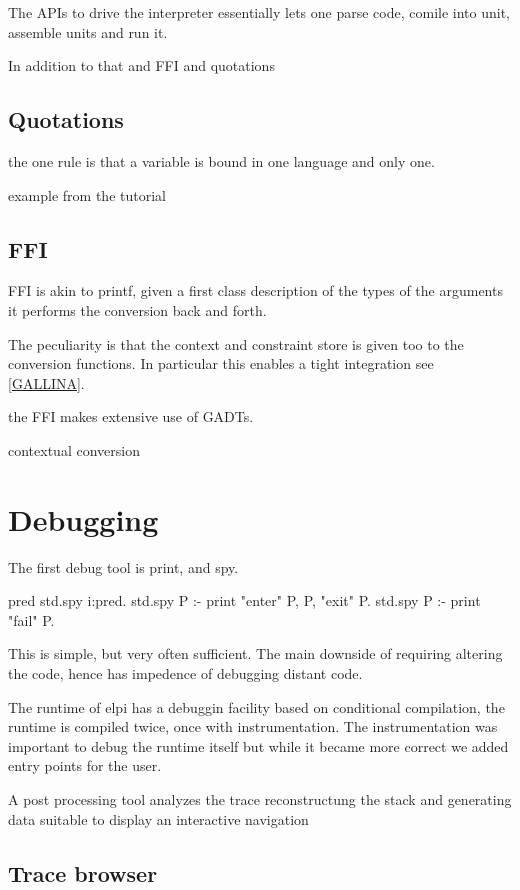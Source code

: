 \documentclass[a4paper, 11pt]{book}
\begin{document}
The APIs to drive the interpreter essentially lets one parse code, comile into
unit, assemble units and run it.

In addition to that and FFI and quotations

\subsection{Quotations}

the one rule is that a variable is bound in one language and only
one.

example from the tutorial

\subsection{FFI}\label{FFI}

FFI is akin to printf, given a first class description of
the types of the arguments it performs the conversion
back and forth.

The peculiarity is that the context and constraint store
is given too to the conversion functions. In particular
this enables a tight integration see \ref{GALLINA}.

the FFI makes extensive use of GADTs.

contextual conversion

\section{Debugging}

The first debug tool is print, and spy.

\begin{elpicode}
pred std.spy i:pred.
std.spy P :- print "enter" P, P, "exit" P.
std.spy P :- print "fail" P.
\end{elpicode}

This is simple, but very often sufficient.
The main downside of requiring altering the code, hence has impedence
of debugging distant code.

The runtime of elpi has a debuggin facility based on conditional compilation,
the runtime is compiled twice, once with instrumentation.
The instrumentation was important to debug the runtime itself
but while it became more correct we added entry points for the user.

A post processing tool analyzes the trace reconstructung the
stack and generating data suitable to display an interactive navigation

\subsection{Trace browser}
\end{document}
